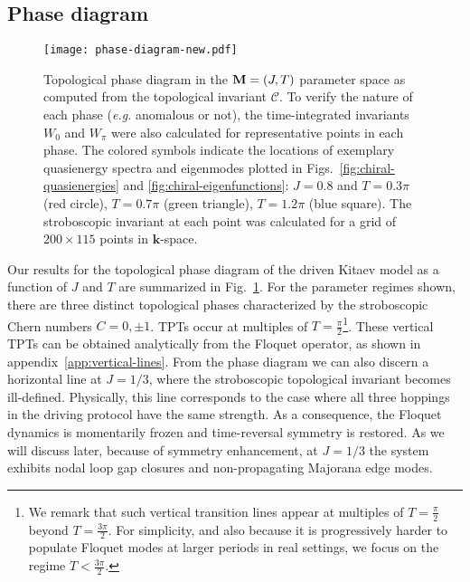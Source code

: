 \documentclass[aps,prb,twocolumn,superscriptaddress,groupedaddress]{revtex4}
\begin{document}
\subsection{Phase diagram}
\label{subsec:PD}

\begin{figure}
\centering
\texttt{[image: phase-diagram-new.pdf]}
\caption{Topological phase diagram in the ${\bf M}=(J,T)$ parameter space as computed from the topological invariant $\mathcal{C}$.
To verify the nature of each phase (\textit{e.g.} anomalous or not), the time-integrated invariants $W_0$ and $W_{\pi}$ were also calculated for representative points in each phase.
The colored symbols indicate the locations of exemplary quasienergy spectra and eigenmodes plotted in Figs.~\ref{fig:chiral-quasienergies} and \ref{fig:chiral-eigenfunctions}: $J=0.8$ and $T=0.3\pi$ (red circle), $T=0.7\pi$ (green triangle), $T=1.2\pi$  (blue square).
The stroboscopic invariant at each point was calculated for a grid of $200 \times 115$ points in $\mathbf{k}$-space.
} 
\label{fig:phase-diagram}
\end{figure}

 Our results for the topological phase diagram of the driven Kitaev model as a function of $J$ and $T$
 are summarized in Fig.~\ref{fig:phase-diagram}. 
For the parameter regimes shown, there are three distinct topological phases characterized by the
stroboscopic Chern numbers $C=0,\pm1$. 
TPTs occur at multiples of $T=\frac{\pi}{2}$\footnote{We remark that such vertical transition lines appear at multiples of $T=\frac{\pi}{2}$ beyond $T=\frac{3\pi}{2}$. For simplicity, and also because it is progressively harder to populate Floquet modes at larger periods in real settings, we focus on the regime $T < \frac{3\pi}{2}$.}.
These vertical TPTs can be obtained analytically from the Floquet operator, as shown in appendix~\ref{app:vertical-lines}.
From the phase diagram we can also discern a horizontal line at $J=1/3$, where the stroboscopic topological invariant becomes ill-defined.
Physically, this line corresponds to the case where all three hoppings in the driving protocol have the same strength.
As a consequence, the Floquet dynamics is momentarily frozen and time-reversal symmetry is restored.
As we will discuss later, because of symmetry enhancement, at $J=1/3$ the system exhibits nodal loop gap closures and non-propagating Majorana edge modes.
\end{document}
